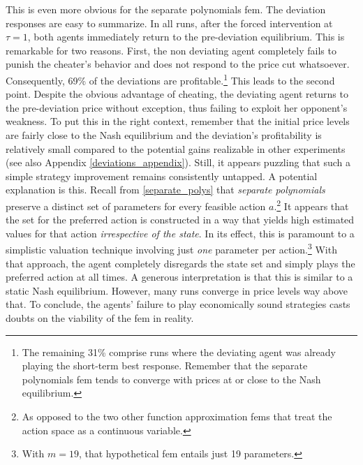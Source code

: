 This is even more obvious for the separate polynomials \gls{fem}. The deviation responses are easy to summarize. In all runs, after the forced intervention at $\tau = 1$, both agents immediately return to the pre-deviation equilibrium. This is remarkable for two reasons. First, the non deviating agent completely fails to punish the cheater's behavior and does not respond to the price cut whatsoever. Consequently, 69\% of the deviations are profitable.\footnote{The remaining 31\% comprise runs where the deviating agent was already playing the short-term best response. Remember that the separate polynomials \gls{fem} tends to converge with prices at or close to the Nash equilibrium.} This leads to the second point. Despite the obvious advantage of cheating, the deviating agent returns to the pre-deviation price without exception, thus failing to exploit her opponent's weakness. To put this in the right context, remember that the initial price levels are fairly close to the Nash equilibrium and the deviation's profitability is relatively small compared to the potential gains realizable in other experiments (see also Appendix \ref{deviations_appendix}). Still, it appears puzzling that such a simple strategy improvement remains consistently untapped. A potential explanation is this. Recall from \autoref{separate_polys} that \emph{separate polynomials} preserve a distinct set of parameters for every feasible action $a$.\footnote{As opposed to the two other function approximation \gls{fem}s that treat the action space as a continuous variable.} It appears that the set for the preferred action is constructed in a way that yields high estimated values for that action \emph{irrespective of the state}. In its effect, this is paramount to a simplistic valuation technique involving just \emph{one} parameter per action.\footnote{With $m=19$, that hypothetical \gls{fem} entails just 19 parameters.} With that approach, the agent completely disregards the state set and simply plays the preferred action at all times. A generous interpretation is that this is similar to a static Nash equilibrium. However, many runs converge in price levels way above that. To conclude, the agents' failure to play economically sound strategies casts doubts on the viability of the \gls{fem} in reality.

